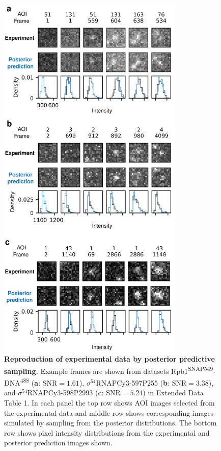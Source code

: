 \begin{figure}[h]
\centering
\includegraphics[width=89mm]{figures/figure4/figure4.png}
\caption{\textbf{Reproduction of experimental data by posterior predictive sampling.} Example frames are shown from datasets Rpb1\textsuperscript{SNAP549}-DNA\textsuperscript{488} (\textbf{a}: $\mathrm{SNR}=1.61$), $\sigma^{54}$RNAPCy3-597P255 (\textbf{b}: $\mathrm{SNR}=3.38$), and $\sigma^{54}$RNAPCy3-598P2993 (\textbf{c}: $\mathrm{SNR}=5.24$) in Extended Data Table 1. In each panel the top row shows AOI images selected from the experimental data and middle row shows corresponding images simulated by sampling from the posterior distributions. The bottom row shows pixel intensity distributions from the experimental and posterior prediction images shown. }
\label{fig:posterior_samples}
\end{figure}

